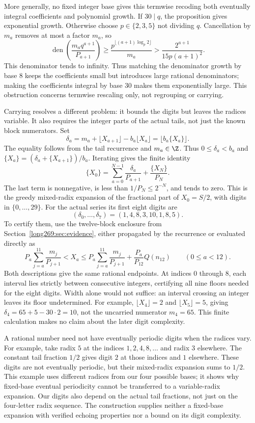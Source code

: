 More generally, no fixed integer base gives this termwise recoding both
eventually integral coefficients and polynomial growth.  If $30\mid q$,
the proposition gives exponential growth.  Otherwise choose
$p\in\{2,3,5\}$ not dividing $q$.  Cancellation by $m_a$ removes at most
a factor $m_a$, so
\[
 \operatorname{den}\!\left(\frac{m_aq^{a+1}}{P_{a+1}}\right)
 \ge\frac{p^{\lfloor(a+1)\log_p2\rfloor}}{m_a}
 >\frac{2^{a+1}}{15p(a+1)^2}.
\]
This denominator tends to infinity.  Thus matching the denominator growth by base $8$ keeps the coefficients
small but introduces large rational denominators; making the coefficients
integral by base $30$ makes them exponentially large. This obstruction
concerns termwise rescaling only, not regrouping or carrying.

Carrying resolves a different problem: it bounds the digits but leaves
the radices variable. It also requires the integer parts of the actual
tails, not just the known block numerators. Set
\[
 \delta_a=m_a+\lfloor X_{a+1}\rfloor-b_a\lfloor X_a\rfloor
          =\lfloor b_a\{X_a\}\rfloor.
\]
The equality follows from the tail recurrence and $m_a\in\Z$.  Thus
$0\le\delta_a<b_a$ and $\{X_a\}=(\delta_a+\{X_{a+1}\})/b_a$.
Iterating gives the finite identity
\[
 \{X_0\}=\sum_{a=0}^{N-1}\frac{\delta_a}{P_{a+1}}
              +\frac{\{X_N\}}{P_N}.
\]
The last term is nonnegative, is less than $1/P_N\le2^{-N}$, and tends
to zero.  This is the greedy mixed-radix expansion of the fractional part
of $X_0=S/2$, with digits in $\{0,\ldots,29\}$.
For the actual series its first eight digits are
\[
 (\delta_0,\ldots,\delta_7)=(1,4,8,3,10,1,8,5).
\]
To certify them, use the twelve-block enclosure from
Section~\ref{long269:sec:evidence}, either propagated by the recurrence
or evaluated directly as
\[
 P_a\sum_{j=a}^{11}\frac{m_j}{P_{j+1}}<X_a
 \le P_a\sum_{j=a}^{11}\frac{m_j}{P_{j+1}}
       +\frac{P_a}{P_{12}}Q(n_{12})\qquad(0\le a<12).
\]
Both descriptions give the same rational endpoints. At indices $0$
through $8$, each interval lies strictly between consecutive integers,
certifying all nine floors needed for the eight digits. Width alone
would not suffice: an interval crossing an integer leaves its floor
undetermined.  For example,
$\lfloor X_4\rfloor=2$ and $\lfloor X_5\rfloor=5$, giving
$\delta_4=65+5-30\cdot2=10$, not the uncarried numerator $m_4=65$.
This finite calculation makes no claim about the later digit complexity.

A rational number need not have eventually periodic digits when the radices vary.  For example,
take radix $5$ at the indices $1,2,4,8,\ldots$ and radix $3$ elsewhere.
The constant tail fraction $1/2$ gives digit $2$ at those indices and
$1$ elsewhere.  These digits are not eventually periodic, but their
mixed-radix expansion sums to $1/2$.  This example uses different radices
from our four possible bases; it shows why fixed-base eventual
periodicity cannot be transferred to a variable-radix expansion.  Our digits also
depend on the actual tail fractions, not just on the four-letter radix
sequence.  The construction supplies neither a fixed-base expansion
with verified echoing properties nor a bound on its digit complexity.

